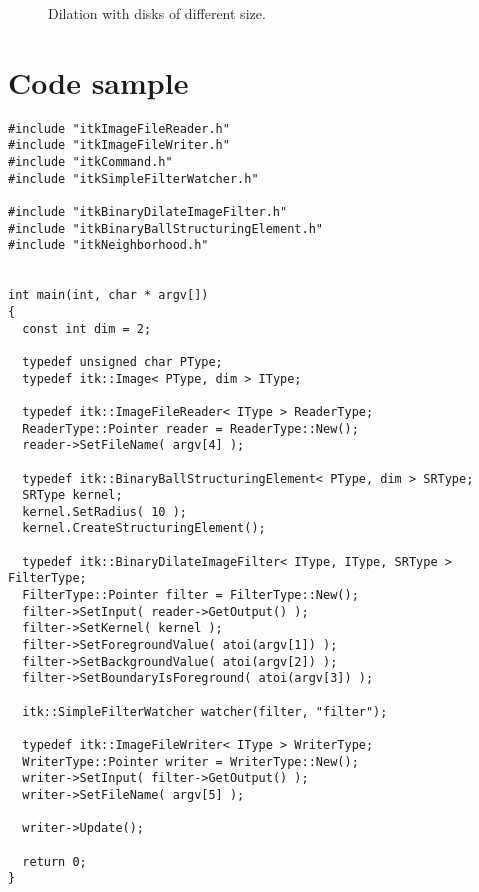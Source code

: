 \documentclass{InsightArticle}
\begin{document}
\begin{figure}[htbp]
\begin{center}
\caption{Dilation with disks of different size.\label{dilate-size}}
\end{center}
\end{figure}


\section{Code sample}

\small \begin{verbatim}
#include "itkImageFileReader.h"
#include "itkImageFileWriter.h"
#include "itkCommand.h"
#include "itkSimpleFilterWatcher.h"

#include "itkBinaryDilateImageFilter.h"
#include "itkBinaryBallStructuringElement.h"
#include "itkNeighborhood.h"


int main(int, char * argv[])
{
  const int dim = 2;
  
  typedef unsigned char PType;
  typedef itk::Image< PType, dim > IType;

  typedef itk::ImageFileReader< IType > ReaderType;
  ReaderType::Pointer reader = ReaderType::New();
  reader->SetFileName( argv[4] );

  typedef itk::BinaryBallStructuringElement< PType, dim > SRType;
  SRType kernel;
  kernel.SetRadius( 10 );
  kernel.CreateStructuringElement();

  typedef itk::BinaryDilateImageFilter< IType, IType, SRType > FilterType;
  FilterType::Pointer filter = FilterType::New();
  filter->SetInput( reader->GetOutput() );
  filter->SetKernel( kernel );
  filter->SetForegroundValue( atoi(argv[1]) );
  filter->SetBackgroundValue( atoi(argv[2]) );
  filter->SetBoundaryIsForeground( atoi(argv[3]) );

  itk::SimpleFilterWatcher watcher(filter, "filter");

  typedef itk::ImageFileWriter< IType > WriterType;
  WriterType::Pointer writer = WriterType::New();
  writer->SetInput( filter->GetOutput() );
  writer->SetFileName( argv[5] );

  writer->Update();

  return 0;
}
\end{verbatim} \normalsize
\end{document}
